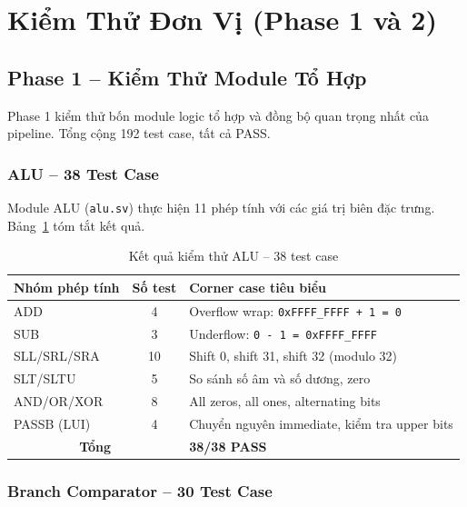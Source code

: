 \section{Kiểm Thử Đơn Vị (Phase 1 và 2)}

\subsection{Phase 1 -- Kiểm Thử Module Tổ Hợp}

Phase 1 kiểm thử bốn module logic tổ hợp và đồng bộ quan trọng nhất của pipeline. Tổng cộng 192 test case, tất cả PASS.

\subsubsection{ALU -- 38 Test Case}

Module ALU (\texttt{alu.sv}) thực hiện 11 phép tính với các giá trị biên đặc trưng. Bảng~\ref{tab:alu-tests} tóm tắt kết quả.

\begin{table}[htbp]
\caption{Kết quả kiểm thử ALU -- 38 test case}
\label{tab:alu-tests}
\begin{center}
\begin{tabular}{|l|c|l|}
\hline
\textbf{Nhóm phép tính} & \textbf{Số test} & \textbf{Corner case tiêu biểu} \\ \hline
ADD & 4 & Overflow wrap: \texttt{0xFFFF\_FFFF + 1 = 0} \\ \hline
SUB & 3 & Underflow: \texttt{0 - 1 = 0xFFFF\_FFFF} \\ \hline
SLL/SRL/SRA & 10 & Shift 0, shift 31, shift 32 (modulo 32) \\ \hline
SLT/SLTU & 5 & So sánh số âm và số dương, zero \\ \hline
AND/OR/XOR & 8 & All zeros, all ones, alternating bits \\ \hline
PASSB (LUI) & 4 & Chuyển nguyên immediate, kiểm tra upper bits \\ \hline
\multicolumn{2}{|c|}{\textbf{Tổng}} & \textbf{38/38 PASS} \\ \hline
\end{tabular}
\end{center}
\end{table}

\subsubsection{Branch Comparator -- 30 Test Case}

